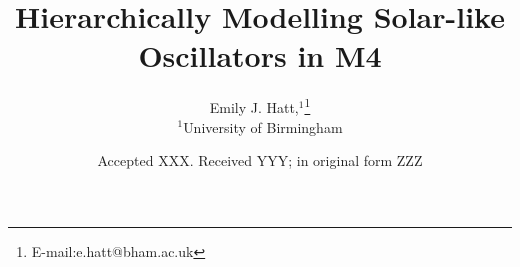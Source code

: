 \documentclass[fleqn,usenatbib]{mnras}
\title[M4 hierarchical modelling]{Hierarchically Modelling Solar-like Oscillators in M4}
\author[Hatt E. et al]{
Emily J. Hatt,$^{1}$\thanks{E-mail:e.hatt@bham.ac.uk}
\\
$^{1}$University of Birmingham
}
\date{Accepted XXX. Received YYY; in original form ZZZ}
\begin{document}
\label{firstpage}
\pagerange{\pageref{firstpage}--\pageref{lastpage}}
\maketitle

\begin{abstract}


\end{abstract}
\end{document}
